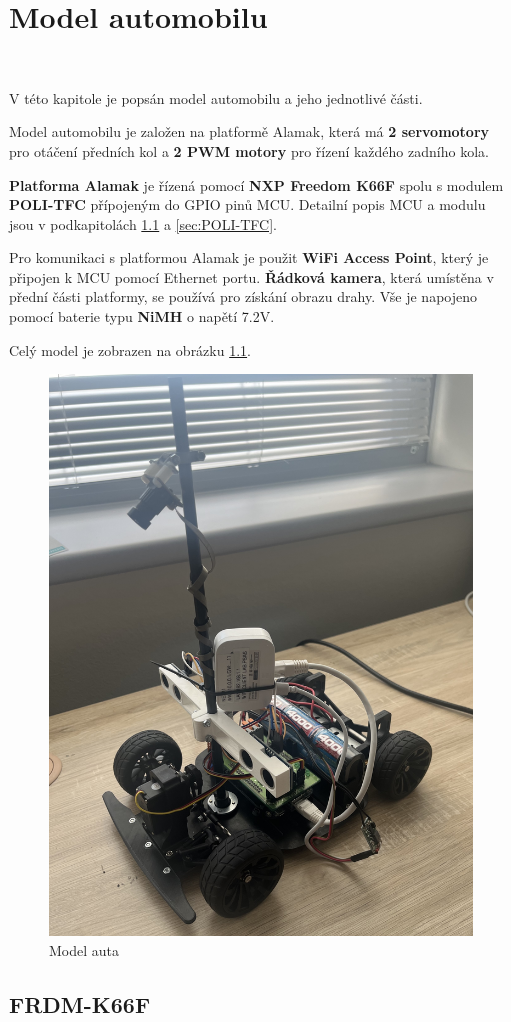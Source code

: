 \chapter{Model automobilu}
\label{sec:CarModel}\
\vspace{-30pt}

V této kapitole je popsán model automobilu a jeho jednotlivé části.

Model automobilu je založen na platformě Alamak, která má
\textbf{2 servomotory} pro otáčení předních kol a
\textbf{2 PWM motory} pro řízení každého
zadního kola.

\textbf{Platforma Alamak} je řízená pomocí \textbf{NXP Freedom K66F}\cite{frdmk66UserGuide} spolu
s modulem \textbf{POLI-TFC} přípojeným do GPIO pinů MCU.
Detailní popis MCU a modulu jsou v podkapitolách \ref{sec:FRDM-K66F}
a \ref{sec:POLI-TFC}.

Pro komunikaci s platformou Alamak je použit \textbf{WiFi Access Point}, který je připojen k MCU pomocí Ethernet portu. \textbf{Řádková kamera}, která umístěna v přední části platformy,
se používá pro získání obrazu drahy. Vše je napojeno pomocí baterie typu \textbf{NiMH} o napětí 7.2V.

Celý model je zobrazen na obrázku \ref{fig:car}.
\begin{figure}[!h]
    \vspace{-10pt}
    \centering
    \includegraphics[width = .45\linewidth]{Figures/car.jpeg}
    \caption{Model auta}
    \label{fig:car}
    \vspace{-10pt}
\end{figure}

\section{FRDM-K66F}
\label{sec:FRDM-K66F}\

